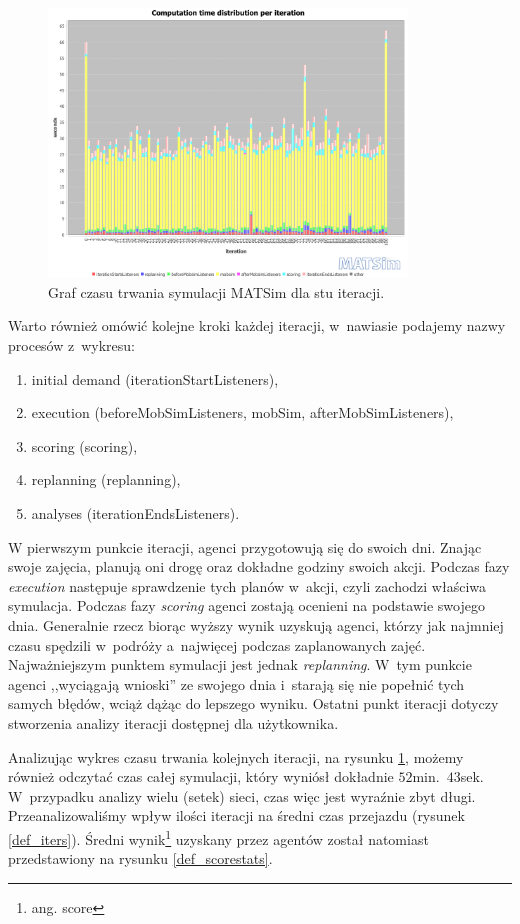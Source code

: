 \documentclass[twoside,12pt]{report}
\begin{document}
\begin{figure}[ht]
\centering
\includegraphics[width=0.85\textwidth]{img/def_stopwatch}
\caption{Graf czasu trwania symulacji MATSim dla stu iteracji.}
\label{def_stopwatch}
\end{figure}

Warto również omówić kolejne kroki każdej iteracji, w~nawiasie podajemy nazwy procesów z~wykresu:
\begin{enumerate}
\item initial demand (iterationStartListeners),
\item execution (beforeMobSimListeners, mobSim, afterMobSimListeners), 
\item scoring (scoring),
\item replanning (replanning),
\item analyses (iterationEndsListeners).
\end{enumerate}

W pierwszym punkcie iteracji, agenci przygotowują się do swoich dni. Znając swoje zajęcia, planują oni drogę oraz dokładne godziny swoich akcji. Podczas fazy \textit{execution} następuje sprawdzenie tych planów w~akcji, czyli zachodzi właściwa symulacja. Podczas fazy \textit{scoring} agenci zostają ocenieni na podstawie swojego dnia. Generalnie rzecz biorąc wyższy wynik uzyskują agenci, którzy jak najmniej czasu spędzili w~podróży a~najwięcej podczas zaplanowanych zajęć. Najważniejszym punktem symulacji jest jednak \textit{replanning}. W~tym punkcie agenci ,,wyciągają wnioski'' ze swojego dnia i~starają się nie popełnić tych samych błędów, wciąż dążąc do lepszego wyniku. Ostatni punkt iteracji dotyczy stworzenia analizy iteracji dostępnej dla użytkownika.

Analizując wykres czasu trwania kolejnych iteracji, na rysunku \ref{def_stopwatch}, możemy również odczytać czas całej symulacji, który wyniósł dokładnie $52$min.~$43$sek.  W~przypadku analizy wielu (setek) sieci, czas więc jest wyraźnie zbyt długi. Przeanalizowaliśmy wpływ ilości iteracji na średni czas przejazdu (rysunek \ref{def_iters}). Średni wynik\footnote{ang. score} uzyskany przez agentów został natomiast przedstawiony na rysunku \ref{def_scorestats}.
\end{document}
